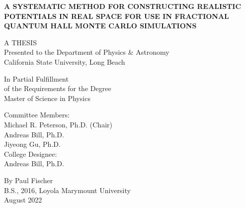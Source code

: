 \begin{titlepage}
    \begin{center}
    
        \normalsize
        \textbf{\uppercase{A systematic method for constructing realistic}}\\
        \bigskip
        \textbf{\uppercase{potentials in real space for use in fractional}}\\
        \bigskip
        \textbf{\uppercase{quantum Hall Monte Carlo simulations}}\\
        \vspace{2cm}
        
        A THESIS \\
        \bigskip
		Presented to the Department of Physics \& Astronomy \\
        \bigskip
        California State University, Long Beach
        
        \vspace{2cm}
        
        In Partial Fulfillment\\
        \bigskip
        of the Requirements for the Degree\\
        \bigskip
        Master of Science in Physics
        
        \vspace{2cm}
        
        Committee Members:\\
        \bigskip
        Michael R. Peterson, Ph.D. (Chair)\\
        Andreas Bill, Ph.D.\\
        Jiyeong Gu, Ph.D.\\
        \bigskip
        College Designee:\\
        \bigskip
        Andreas Bill, Ph.D.
        
        \vspace{2cm}
        
        By Paul Fischer \\
        \bigskip
        B.S., 2016, Loyola Marymount University \\
        \bigskip
	August 2022	
        
    \end{center}
\end{titlepage}